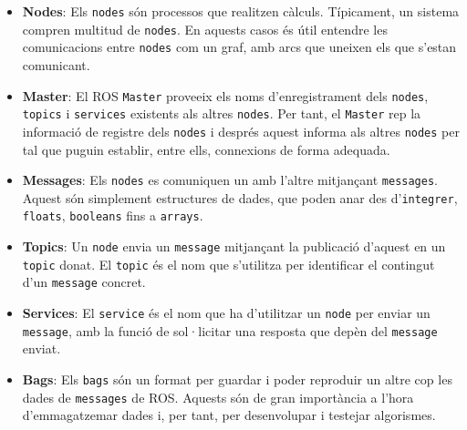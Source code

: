 \documentclass[12pt,a4paper,final,twoside]{article}
\begin{document}
\begin{itemize}
\item \textbf{Nodes}: Els \texttt{nodes} són processos que realitzen càlculs. Típicament, un sistema compren multitud de \texttt{nodes}. En aquests casos és útil entendre les comunicacions entre \texttt{nodes} com un graf, amb arcs que uneixen els que s'estan comunicant.

\item \textbf{Master}: El ROS \texttt{Master} proveeix els noms d'enregistrament dels \texttt{nodes}, \texttt{topics} i \texttt{services} existents als altres \texttt{nodes}. Per tant, el \texttt{Master} rep la informació de registre dels \texttt{nodes} i després aquest informa als altres \texttt{nodes} per tal que puguin establir, entre ells, connexions de forma adequada. 

\item \textbf{Messages}: Els \texttt{nodes} es comuniquen un amb l'altre mitjançant \texttt{messages}. Aquest són simplement estructures de dades, que poden anar des d'\texttt{integrer}, \texttt{floats}, \texttt{booleans} fins a \texttt{arrays}.

\item \textbf{Topics}: Un \texttt{node} envia un \texttt{message} mitjançant la publicació d'aquest en un \texttt{topic} donat. El \texttt{topic} és el nom que s'utilitza per identificar el contingut d'un \texttt{message} concret. 

\item \textbf{Services}: El \texttt{service} és el nom que ha d'utilitzar un \texttt{node} per enviar un \texttt{message}, amb la funció de sol·licitar una resposta que depèn del \texttt{message} enviat.

\item \textbf{Bags}: Els \texttt{bags} són un format per guardar i poder reproduir un altre cop les dades de \texttt{messages} de ROS. Aquests són de gran importància a l'hora d'emmagatzemar dades i, per tant, per desenvolupar i testejar algorismes.
\end{itemize}
\end{document}
